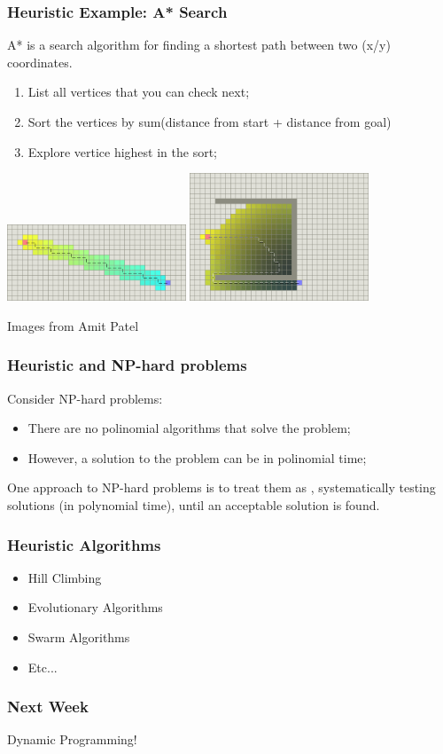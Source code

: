 \documentclass{beamer}
\begin{document}
\begin{frame}
  \frametitle{Heuristic Example: A* Search} 

  A* is a search algorithm for finding a shortest path between two
  (x/y) coordinates.

  {\small
  \begin{enumerate}
  \item List all vertices that you can check next;
  \item Sort the vertices by sum(distance from start + distance from goal)
  \item Explore vertice highest in the sort;
  \end{enumerate}
  }

  \includegraphics[width=0.4\textwidth]{../img/astar2_amitpatel}\hfill
  \includegraphics[width=0.4\textwidth]{../img/astar_amitpatel}

  \hfill{\tiny Images from Amit Patel}

\end{frame}

\begin{frame}
  \frametitle{Heuristic and NP-hard problems}

  Consider NP-hard problems:
  \begin{itemize}
  \item There are no polinomial algorithms that solve the problem;
  \item However, a solution to the problem can be 
    in polinomial time;
  \end{itemize}

  \bigskip

  One approach to NP-hard problems is to treat them as
  , systematically testing solutions 
  (in polynomial time), until an acceptable solution is found.
\end{frame}

\begin{frame}
  \frametitle{Heuristic Algorithms}
  \begin{itemize}
  \item Hill Climbing
  \item Evolutionary Algorithms
  \item Swarm Algorithms
  \item Etc...
  \end{itemize}
\end{frame}

\begin{frame}
  \frametitle{Next Week}
  \begin{center}
    Dynamic Programming!
  \end{center}
\end{frame}
\end{document}
